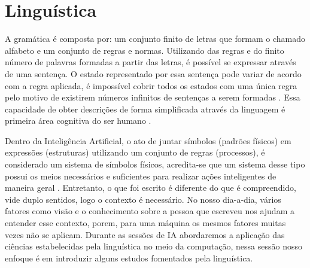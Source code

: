 \section{Linguística}
A gramática é composta por: um conjunto finito de letras que formam o chamado alfabeto e um conjunto de regras e normas. Utilizando das regras e do finito número de palavras formadas a partir das letras, é possível se expressar através de uma sentença. O estado representado por essa sentença pode variar de acordo com a regra aplicada, é impossível cobrir todos os estados com uma única regra pelo motivo de existirem números infinitos de sentenças a serem formadas \cite[13-25]{chomsky2002syntactic}. Essa capacidade de obter descrições de forma simplificada através da linguagem é primeira área cognitiva do ser humano \cite[131]{putnam1975mind}.

Dentro da Inteligência Artificial, o ato de juntar símbolos (padrões físicos) em expressões (estruturas) utilizando um conjunto de regras (processos), é considerado um sistema de símbolos físicos, acredita-se que um sistema desse tipo possui os meios necessários e suficientes para realizar ações inteligentes de maneira geral \cite[116]{newell1976ComputerSA}. Entretanto, o que foi escrito é diferente do que é compreendido, vide duplo sentidos, logo o contexto é necessário. No nosso dia-a-dia, vários fatores como visão e o conhecimento sobre a pessoa que escreveu nos ajudam a entender esse contexto, porem, para uma máquina os mesmos fatores muitas vezes não se aplicam. Durante as sessões de IA abordaremos a aplicação das ciências estabelecidas pela linguística no meio da computação, nessa sessão nosso enfoque é em introduzir alguns estudos fomentados pela linguística.



